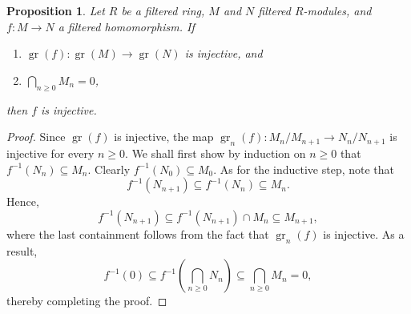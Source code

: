 \documentclass[11pt]{article}
\theoremstyle{thmstyle}
\newtheorem{proposition}[theorem]{Proposition}
\theoremstyle{defstyle}
\renewcommand{\ge}{\geqslant}
\newcommand{\gr}{\operatorname{gr}}
\begin{document}

\begin{proposition}
    Let $R$ be a filtered ring, $M$ and $N$ filtered $R$-modules, and $f\colon M\to N$ a filtered homomorphism. If 
    \begin{enumerate}[label=(\roman*)]
        \item $\gr(f)\colon\gr(M)\to\gr(N)$ is injective, and 
        \item $\displaystyle\bigcap_{n\ge 0} M_n = 0$, 
    \end{enumerate}
    then $f$ is injective.
\end{proposition}
\begin{proof}
    Since $\gr(f)$ is injective, the map $\gr_n(f)\colon M_n/M_{n + 1}\to N_n/N_{n + 1}$ is injective for every $n\ge 0$. We shall first show by induction on $n\ge 0$ that $f^{-1}(N_n)\subseteq M_n$. Clearly $f^{-1}(N_0)\subseteq M_0$. As for the inductive step, note that 
    \begin{equation*}
        f^{-1}(N_{n + 1})\subseteq f^{-1}(N_n)\subseteq M_n.
    \end{equation*}
    Hence, 
    \begin{equation*}
        f^{-1}(N_{n + 1})\subseteq f^{-1}(N_{n + 1})\cap M_n\subseteq M_{n + 1},
    \end{equation*}
    where the last containment follows from the fact that $\gr_n(f)$ is injective. As a result, 
    \begin{equation*}
        f^{-1}(0)\subseteq f^{-1}\left(\bigcap_{n\ge 0} N_n\right)\subseteq\bigcap_{n\ge 0} M_n = 0,
    \end{equation*}
    thereby completing the proof.
\end{proof}
\end{document}
